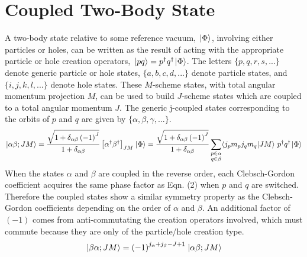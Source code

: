 \documentclass[thesis.tex]{subfiles}
\begin{document}
\chapter{Coupled Two-Body State}
A two-body state relative to some reference vacuum, $\hspace{1pt}| \Phi \rangle$, involving either particles or holes, can be written as the result of acting with the appropriate particle or hole creation operators, $\hspace{1pt}| pq \rangle=p^{\dagger}q^{\dagger}\hspace{1pt}| \Phi \rangle$. The letters $\{p,q,r,s,...\}$ denote generic particle or hole states, $\{a,b,c,d,...\}$ denote particle states, and $\{i,j,k,l,...\}$ denote hole states. These $M$-scheme states, with total angular momentum projection $M$, can be used to build $J$-scheme states which are coupled to a total angular momentum $J$. The generic j-coupled states corresponding to the orbits of $p$ and $q$ are given by $\{\alpha,\beta,\gamma,...\}$.
\begin{equation}
\ket{\alpha\beta;JM}=\frac{\sqrt{1+\delta_{\alpha\beta}\left(-1\right)^{J}}}{1+\delta_{\alpha\beta}}\left[\alpha^{\dagger}\beta^{\dagger}\right]_{JM}\ket{\Phi}=\frac{\sqrt{1+\delta_{\alpha\beta}\left(-1\right)^{J}}}{1+\delta_{\alpha\beta}}\sum_{\substack{p\in\alpha \\ q\in\beta}}\braket{j_{p}m_{p}j_{q}m_{q}}{JM}\ p^{\dagger}q^{\dagger}\ket{\Phi}
\end{equation}
When the states $\alpha$ and $\beta$ are coupled in the reverse order, each Clebsch-Gordon coefficient acquires the same phase factor as Eqn. (2) when $p$ and $q$ are switched. Therefore the coupled states show a similar symmetry property as the Clebsch-Gordon coefficients depending on the order of $\alpha$ and $\beta$. An additional factor of $\left(-1\right)$ comes from anti-commutating the creation operators involved, which must commute because they are only of the particle/hole creation type.
\begin{equation}
\hspace{1pt}| \beta\alpha;JM \rangle=\left(-1\right)^{j_{\alpha}+j_{\beta}-J+1}\hspace{1pt}| \alpha\beta;JM \rangle
\end{equation}
\end{document}
